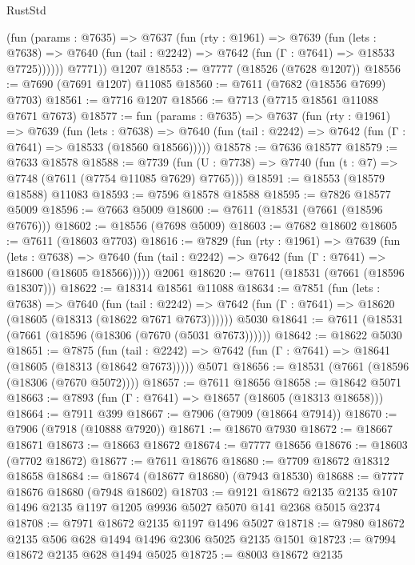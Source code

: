 \begin{lexlean}{RustStd}
\begin{coremodule}
          (fun (params : @7635) =>
          @7637
            (fun (rty : @1961) =>
            @7639
              (fun (lets : @7638) =>
              @7640 (fun (tail : @2242) => @7642 (fun (Γ : @7641) => @18533 @7725))))))
        @7771))
    @1207
@18553 := @7777 (@18526 (@7628 @1207))
@18556 := @7690 (@7691 @1207) @11085
@18560 := @7611 (@7682 (@18556 @7699) @7703)
@18561 := @7716 @1207
@18566 := @7713 (@7715 @18561 @11088 @7671 @7673)
@18577 := fun (params : @7635) =>
  @7637
    (fun (rty : @1961) =>
    @7639
      (fun (lets : @7638) =>
      @7640 (fun (tail : @2242) => @7642 (fun (Γ : @7641) => @18533 (@18560 @18566)))))
@18578 := @7636 @18577
@18579 := @7633 @18578
@18588 := @7739
    (fun (U : @7738) => @7740 (fun (t : @7) => @7748 (@7611 (@7754 @11085 @7629) @7765)))
@18591 := @18553 (@18579 @18588) @11083
@18593 := @7596 @18578 @18588
@18595 := @7826 @18577 @5009
@18596 := @7663 @5009
@18600 := @7611 (@18531 (@7661 (@18596 @7676)))
@18602 := @18556 (@7698 @5009)
@18603 := @7682 @18602
@18605 := @7611 (@18603 @7703)
@18616 := @7829
    (fun (rty : @1961) =>
    @7639
      (fun (lets : @7638) =>
      @7640 (fun (tail : @2242) => @7642 (fun (Γ : @7641) => @18600 (@18605 @18566)))))
    @2061
@18620 := @7611 (@18531 (@7661 (@18596 @18307)))
@18622 := @18314 @18561 @11088
@18634 := @7851
    (fun (lets : @7638) =>
    @7640
      (fun (tail : @2242) =>
      @7642 (fun (Γ : @7641) => @18620 (@18605 (@18313 (@18622 @7671 @7673))))))
    @5030
@18641 := @7611 (@18531 (@7661 (@18596 (@18306 (@7670 (@5031 @7673))))))
@18642 := @18622 @5030
@18651 := @7875
    (fun (tail : @2242) => @7642 (fun (Γ : @7641) => @18641 (@18605 (@18313 (@18642 @7673)))))
    @5071
@18656 := @18531 (@7661 (@18596 (@18306 (@7670 @5072))))
@18657 := @7611 @18656
@18658 := @18642 @5071
@18663 := @7893 (fun (Γ : @7641) => @18657 (@18605 (@18313 @18658)))
@18664 := @7911 @399
@18667 := @7906 (@7909 (@18664 @7914))
@18670 := @7906 (@7918 (@10888 @7920))
@18671 := @18670 @7930
@18672 := @18667 @18671
@18673 := @18663 @18672
@18674 := @7777 @18656
@18676 := @18603 (@7702 @18672)
@18677 := @7611 @18676
@18680 := @7709 @18672 @18312 @18658
@18684 := @18674 (@18677 @18680) (@7943 @18530)
@18688 := @7777 @18676 @18680 (@7948 @18602)
@18703 := @9121
    @18672
    @2135
    @2135
    @107
    @1496
    @2135
    @1197
    @1205
    @9936
    @5027
    @5070
    @141
    @2368
    @5015
    @2374
@18708 := @7971 @18672 @2135 @1197 @1496 @5027
@18718 := @7980 @18672 @2135 @506 @628 @1494 @1496 @2306 @5025 @2135 @1501
@18723 := @7994 @18672 @2135 @628 @1494 @5025
@18725 := @8003 @18672 @2135

\end{coremodule}
\end{lexlean}
